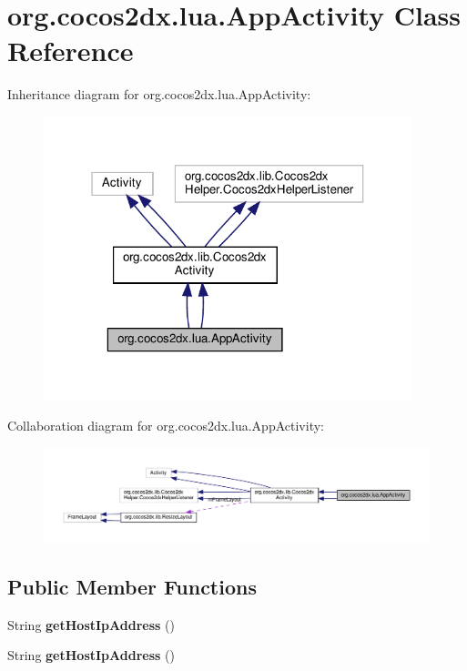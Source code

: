 \hypertarget{classorg_1_1cocos2dx_1_1lua_1_1AppActivity}{}\section{org.\+cocos2dx.\+lua.\+App\+Activity Class Reference}
\label{classorg_1_1cocos2dx_1_1lua_1_1AppActivity}


Inheritance diagram for org.\+cocos2dx.\+lua.\+App\+Activity\+:
\nopagebreak
\begin{figure}[H]
\begin{center}
\leavevmode
\includegraphics[width=304pt]{classorg_1_1cocos2dx_1_1lua_1_1AppActivity__inherit__graph}
\end{center}
\end{figure}


Collaboration diagram for org.\+cocos2dx.\+lua.\+App\+Activity\+:
\nopagebreak
\begin{figure}[H]
\begin{center}
\leavevmode
\includegraphics[width=350pt]{classorg_1_1cocos2dx_1_1lua_1_1AppActivity__coll__graph}
\end{center}
\end{figure}
\subsection*{Public Member Functions}
\begin{DoxyCompactItemize}
\item 
\mbox{\label{classorg_1_1cocos2dx_1_1lua_1_1AppActivity_a967aafd07ea7941cce557b1cfd321545}} 
String {\bfseries get\+Host\+Ip\+Address} ()
\item 
\mbox{\label{classorg_1_1cocos2dx_1_1lua_1_1AppActivity_a967aafd07ea7941cce557b1cfd321545}} 
String {\bfseries get\+Host\+Ip\+Address} ()
\end{DoxyCompactItemize}
